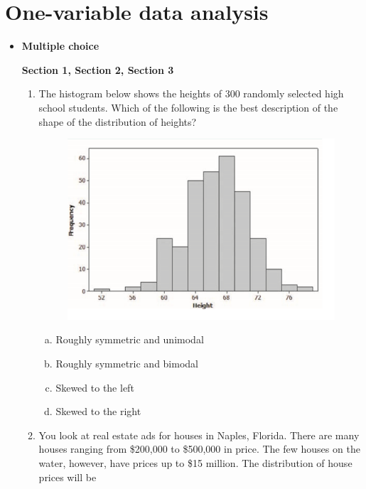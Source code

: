 \documentclass[a4paper,12pt,twoside]{book}
\begin{document}
\pagestyle{fancy}
\fancyhf{}
\renewcommand{\chaptermark}[1]{ \markboth{#1}{} }
\fancyhead[CE,CO]{\leftmark}
\fancyfoot[LE,RO]{\thepage}

\chapter{One-variable data analysis}
\newpage

\begin{itemize}
\item \textbf{\large{Multiple choice}}\vspace{0.3cm}

\textbf{Section 1, Section 2, Section 3}
 \begin{enumerate}
  \item The histogram below shows the heights of 300 randomly selected high school students. Which of the following is the best description of the shape of the distribution of heights?
      \begin{figure}[H]
        \centering
         \includegraphics[scale=0.6]{figure1.png}
      \end{figure}
  
      \begin{enumerate}[(a), start = 1]
       \item Roughly symmetric and unimodal
       \item Roughly symmetric and bimodal
       \item Skewed to the left
       \item Skewed to the right
      \end{enumerate}
  \vspace{0.3cm}   
  \item You look at real estate ads for houses in Naples, Florida. There are many houses ranging from \$200,000 to \$500,000 in price. The few houses on the water, however, have prices up to \$15 million. The distribution of house prices will be 
  

\end{enumerate}
\end{itemize}
\end{document}
